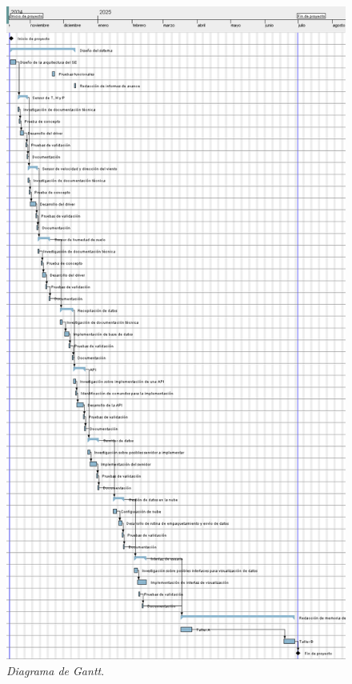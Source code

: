 \documentclass[
11pt, %
]{charter}
\begin{document}
\begin{figure}[htpb]
\centering 
\includegraphics[width=1\textwidth, height=.9\textheight]{./Figuras/DiagramaGantt.png}
\caption{\textit{Diagrama de Gantt}.}
\label{fig:diagGantt}
\end{figure}
\end{document}
